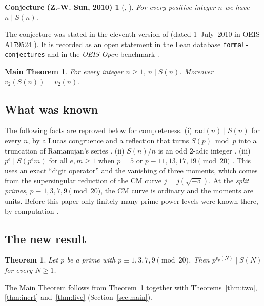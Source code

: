 \documentclass[11pt]{amsart}
\newtheorem{theorem}{Theorem}[section]
\newtheorem*{maintheorem}{Main Theorem}
\newtheorem*{conjecture*}{Conjecture (Z.-W. Sun, 2010)}
\theoremstyle{definition}
\theoremstyle{remark}
\begin{document}
\begin{conjecture*}[{\cite[Conjecture 5.8(ii)]{Sun2010}, \cite{OEIS}}]
For every positive integer $n$ we have $n\mid S(n)$.
\end{conjecture*}

The conjecture was stated in the eleventh version of \cite{Sun2010} (dated 1~July~2010 in
OEIS A179524 \cite{OEIS}). It is recorded as an open statement in the Lean database
\texttt{formal-conjectures} \cite{FC} and in the \emph{OEIS Open} benchmark \cite{OO}.

\begin{maintheorem}
For every integer $n\ge1$, $n\mid S(n)$. Moreover $v_2(S(n))=v_2(n)$.
\end{maintheorem}

\subsection{What was known}
The following facts are reproved below for completeness.
(i) $\mathrm{rad}(n)\mid S(n)$ for every $n$, by a Lucas congruence and a reflection that turns
$S(p)\bmod p$ into a truncation of Ramanujan's series \cite{EarlierNote,K26}.
(ii) $S(n)/n$ is an odd $2$-adic integer \cite{K26}.
(iii) $p^e\mid S(p^em)$ for all $e,m\ge1$ when $p=5$ or $p\equiv11,13,17,19\pmod{20}$
\cite{K26}. This uses an exact ``digit operator'' and the vanishing of three
moments, which comes from the supersingular reduction of the CM curve $j=j(\sqrt{-5})$.
At the \emph{split primes}, $p\equiv1,3,7,9\pmod{20}$, the CM curve is ordinary and the moments
are units. Before this paper only finitely many prime-power levels were known there,
by computation \cite{EarlierNote,K26}.

\subsection{The new result}
\begin{theorem}\label{thm:B}
Let $p$ be a prime with $p\equiv1,3,7,9\pmod{20}$. Then $p^{v_p(N)}\mid S(N)$ for every $N\ge1$.
\end{theorem}

The Main Theorem follows from Theorem~\ref{thm:B} together with Theorems~\ref{thm:two},
\ref{thm:inert} and~\ref{thm:five} (Section~\ref{sec:main}).
\end{document}

